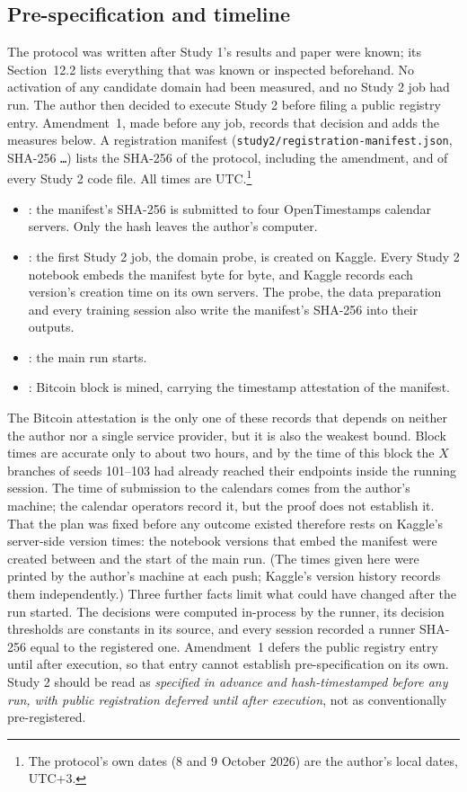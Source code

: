\documentclass[11pt]{article}
\begin{document}
\subsection{Pre-specification and timeline}
\label{sec:s2prespec}

The protocol was written after Study 1's results and paper were known; its Section~12.2 lists everything that was
known or inspected beforehand. No activation of any candidate domain had been measured, and no Study 2 job had
run. The author then decided to execute Study 2 before filing a public registry entry. Amendment~1, made before any
job, records that decision and adds the measures below. A registration manifest
(\texttt{study2/registration-manifest.json}, SHA-256 \texttt{\twoManifestSha\ldots}) lists the SHA-256 of the
protocol, including the amendment, and of every Study 2 code file. All times are UTC.\footnote{The protocol's own
dates (8 and 9 October 2026) are the author's local dates, UTC+3.}
\begin{itemize}[leftmargin=1.4em,itemsep=1pt]
  \item \twoSubmit: the manifest's SHA-256 is submitted to four OpenTimestamps calendar servers. Only the hash
        leaves the author's computer.
  \item \twoFirstJob: the first Study 2 job, the domain probe, is created on Kaggle. Every Study 2 notebook embeds
        the manifest byte for byte, and Kaggle records each version's creation time on its own servers. The probe,
        the data preparation and every training session also write the manifest's SHA-256 into their outputs.
  \item \twoRunStart: the main run starts.
  \item \twoBlockTime: Bitcoin block \twoBlock{} is mined, carrying the timestamp attestation of the manifest.
\end{itemize}

The Bitcoin attestation is the only one of these records that depends on neither the author nor a single service
provider, but it is also the weakest bound. Block times are accurate only to about two hours, and by the time of
this block the $X$ branches of seeds 101--103 had already reached their endpoints inside the running session. The
time of submission to the calendars comes from the author's machine; the calendar operators record it, but the
proof does not establish it. That the plan was fixed before any outcome existed therefore rests on Kaggle's
server-side version times: the notebook versions that embed the manifest were created between \twoFirstJob{} and
the start of the main run. (The times given here were printed by the author's machine at each push; Kaggle's
version history records them independently.) Three further facts limit what could have changed after the run
started. The decisions were computed in-process by the runner, its decision thresholds are constants in its
source, and every session recorded a runner SHA-256 equal to the registered one. Amendment~1 defers the public
registry entry until after execution, so that entry cannot establish pre-specification on its own. Study 2
should be read as \emph{specified in advance and hash-timestamped before any run, with public registration
deferred until after execution}, not as conventionally pre-registered.
\end{document}

